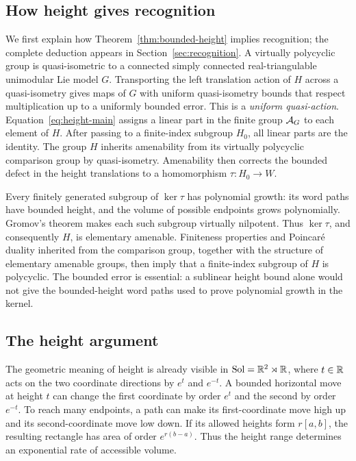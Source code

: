 \subsection{How height gives recognition}

We first explain how Theorem~\ref{thm:bounded-height} implies recognition; the complete deduction appears in Section~\ref{sec:recognition}. A virtually polycyclic group is quasi-isometric to a connected simply connected real-triangulable unimodular Lie model $G$. Transporting the left translation action of $H$ across a quasi-isometry gives maps of $G$ with uniform quasi-isometry bounds that respect multiplication up to a uniformly bounded error. This is a \emph{uniform quasi-action}. Equation~\eqref{eq:height-main} assigns a linear part in the finite group $\mathcal A_G$ to each element of $H$. After passing to a finite-index subgroup $H_0$, all linear parts are the identity. The group $H$ inherits amenability from its virtually polycyclic comparison group by quasi-isometry. Amenability then corrects the bounded defect in the height translations to a homomorphism $\tau:H_0\to W$.

Every finitely generated subgroup of $\ker\tau$ has polynomial growth: its word paths have bounded height, and the volume of possible endpoints grows polynomially. Gromov's theorem makes each such subgroup virtually nilpotent. Thus $\ker\tau$, and consequently $H$, is elementary amenable. Finiteness properties and Poincar\'e duality inherited from the comparison group, together with the structure of elementary amenable groups, then imply that a finite-index subgroup of $H$ is polycyclic. The bounded error is essential: a sublinear height bound alone would not give the bounded-height word paths used to prove polynomial growth in the kernel.

\subsection{The height argument}

The geometric meaning of height is already visible in
$\mathrm{Sol}=\mathbb R^2\rtimes\mathbb R$, where $t\in\mathbb R$ acts on the two coordinate
directions by $e^t$ and $e^{-t}$.  A bounded horizontal move at height $t$
can change the first coordinate by order $e^t$ and the second by order
$e^{-t}$.  To reach many endpoints, a path can make its first-coordinate
move high up and its second-coordinate move low down.  If its allowed
heights form $r[a,b]$, the resulting rectangle has area of order
$e^{r(b-a)}$.  Thus the height range determines an exponential rate of
accessible volume.

